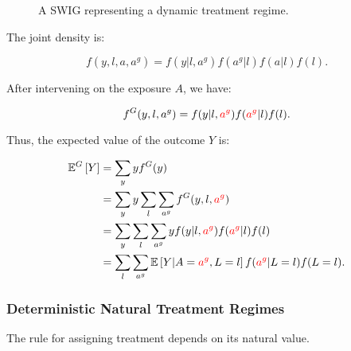 \documentclass[12pt,twoside]{article}
\begin{document}
\begin{figure}[ht]
\centering
{}
\caption{A SWIG representing a dynamic treatment regime.}
\label{fig:swig_det_dyn_inv}
\end{figure}

The joint density is:

\begin{equation}
    f(y,l,a,a^g) = f(y|l,a^g) f(a^g|l) f(a|l) f(l).
\end{equation}

After intervening on the exposure $A$, we have:

\begin{equation}
    f^G(y,l,a^g) = f(y|l,\textcolor{red}{a^g}) f(\textcolor{red}{a^g}|l) f(l).
\end{equation}

Thus, the expected value of the outcome $Y$ is:

\begin{align}
    \mathbb{E}^G \left[ Y \right] &= \sum_y y f^G(y) \\
    &= \sum_y y \sum_l \sum_{a^g} f^G(y,l,\textcolor{red}{a^g}) \\
    &= \sum_y \sum_l \sum_{a^g} y f(y|l,\textcolor{red}{a^g}) f(\textcolor{red}{a^g}|l) f(l) \\
    &= \sum_l \sum_{a^g} \mathbb{E} \left[ Y|A=\textcolor{red}{a^g},L=l\right] f(\textcolor{red}{a^g}|L=l) f(L=l).
\end{align}

\subsubsection{Deterministic Natural Treatment Regimes}
The rule for assigning treatment depends on its natural value.
\end{document}
